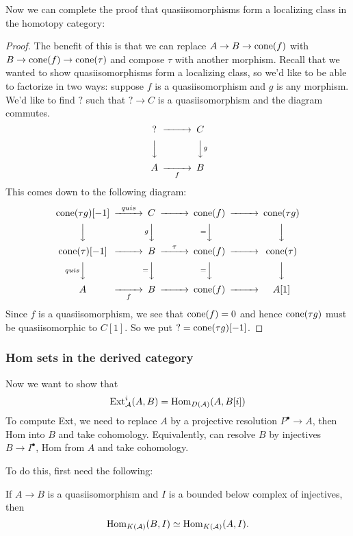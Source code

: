 Now we can complete the proof that quasiisomorphisms form a localizing class in the homotopy category:
\begin{proof}
    The benefit of this is that we can replace $A\rightarrow B\rightarrow \operatorname{cone}(f)$ with $B\rightarrow \operatorname{cone}(f)\rightarrow \operatorname{cone}(\tau)$ and compose $\tau$ with another morphism. Recall that we wanted to show quasiisomorphisms form a localizing class, so we'd like to be able to factorize in two ways: suppose $f$ is a quasiisomorphism and $g$ is any morphism. We'd like to find $?$ such that $?\rightarrow C$ is a quasiisomorphism and the diagram commutes.
    $$\begin{CD} ? @> > > C \\ @VVV @VVgV \\ A @> > f> B\end{CD}$$
    This comes down to the following diagram:
    $$\begin{CD} \cone(\tau g)[-1]@> quis> > C @> > > \cone(f) @> > > \cone(\tau g)\\ @VVV @VgVV @V=VV @VVV \\ \cone(\tau)[-1]@> > > B @> \tau> > \cone(f)@> > > \cone(\tau) \\ @VquisVV @V=VV @V=VV @VVV \\ A @> > f > B @> > > \cone(f)@> > > A[1]\end{CD}$$
    Since $f$ is a quasiisomorphism, we see that $\operatorname{cone}(f)=0$ and hence $\operatorname{cone}(\tau g)$ must be quasiisomorphic to $C[1]$. So we put $?=\operatorname{cone}(\tau g)[-1]$.
\end{proof}

\subsubsection{Hom sets in the derived category}

Now we want to show that $$\operatorname{Ext}_{\mathcal{A}}^i(A,B)=\operatorname{Hom}_{D(\mathcal{A})}(A, B[i])$$
To compute Ext, we need to replace $A$ by a projective resolution $P^\bullet \rightarrow A$, then Hom into $B$ and take cohomology. Equivalently, can resolve $B$ by injectives $B\rightarrow I^\bullet$, Hom from $A$ and take cohomology.

To do this, first need the following:

\begin{proposition}{}{}
     If $A\rightarrow B$ is a quasiisomorphism and $I$ is a bounded below complex of injectives, then $$\operatorname{Hom}_{K(\mathcal{A})}(B,I)\simeq \operatorname{Hom}_{K(\mathcal{A})}(A,I).$$
\end{proposition}

